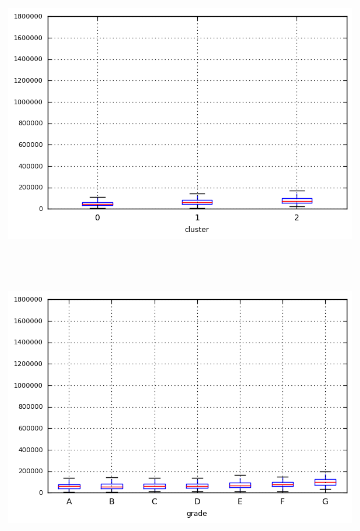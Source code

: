 \begin{anexosenv}
\begin{figure}[ht!]
\begin{subfigure}[t]{0.45\textwidth}
        \end{subfigure}
\end{figure}



\begin{figure}[t!]
    \centering
        \caption{\emph{Boxplots} de annual\textunderscore inc }
        \begin{subfigure}[t]{0.45\textwidth}
            \centering

            \centerline{\includegraphics[width=1\textwidth]{img/annual_inc_by_cluster}}
        \end{subfigure}%
        ~ 
        \begin{subfigure}[t]{0.45\textwidth}
            \centering
   
            \centerline{\includegraphics[width=1\textwidth]{img/annual_inc_by_grade}}


\end{subfigure}
\end{figure}
\end{anexosenv}
